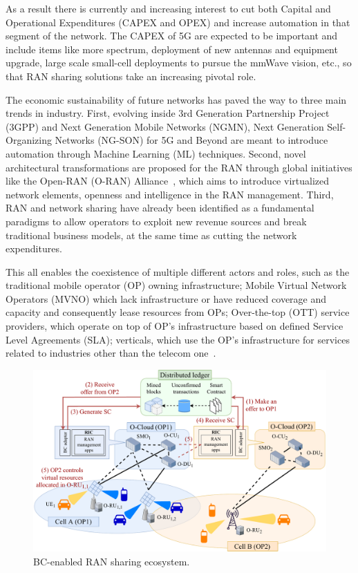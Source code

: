 \documentclass[journal]{IEEEtran}
\begin{document}
As a result there is currently and increasing interest to cut both Capital and Operational Expenditures (CAPEX and OPEX) and increase automation in that segment of the network. The CAPEX of 5G are expected to be important and include items like more spectrum, deployment of new antennas and equipment upgrade, large scale small-cell deployments to pursue the mmWave vision, etc., so that RAN sharing solutions take an increasing pivotal role. 

The economic sustainability of future networks has paved the way to three main trends in industry. First, evolving inside 3rd Generation Partnership Project (3GPP) and Next Generation Mobile Networks (NGMN), Next Generation Self-Organizing Networks (NG-SON) for 5G and Beyond are meant to introduce automation through Machine Learning (ML) techniques. Second, novel architectural transformations are proposed for the RAN through global initiatives like the Open-RAN (O-RAN) Alliance~\cite{ORAN}, which aims to introduce virtualized network elements, openness and intelligence in the RAN management. Third, RAN and network sharing have already been identified as a fundamental paradigms to allow operators to exploit new revenue sources and break traditional business models, at the same time as cutting the network expenditures. 

This all enables the coexistence of multiple different actors and roles, such as the traditional mobile operator (OP) owning infrastructure; Mobile Virtual Network Operators (MVNO) which lack infrastructure or have reduced coverage and capacity and consequently lease resources from OPs; Over-the-top (OTT) service providers, which operate on top of OP's infrastructure based on defined Service Level Agreements (SLA); verticals, which use the OP's infrastructure for services related to industries other than the telecom one~\cite{samdanis2016network}.

\begin{figure}[ht!]
\includegraphics[width=\linewidth]{blockchain_ran-ecosystem}
\caption{BC-enabled RAN sharing ecosystem.}
\label{fig:blockchain_ecosystem}
\end{figure}
\end{document}
